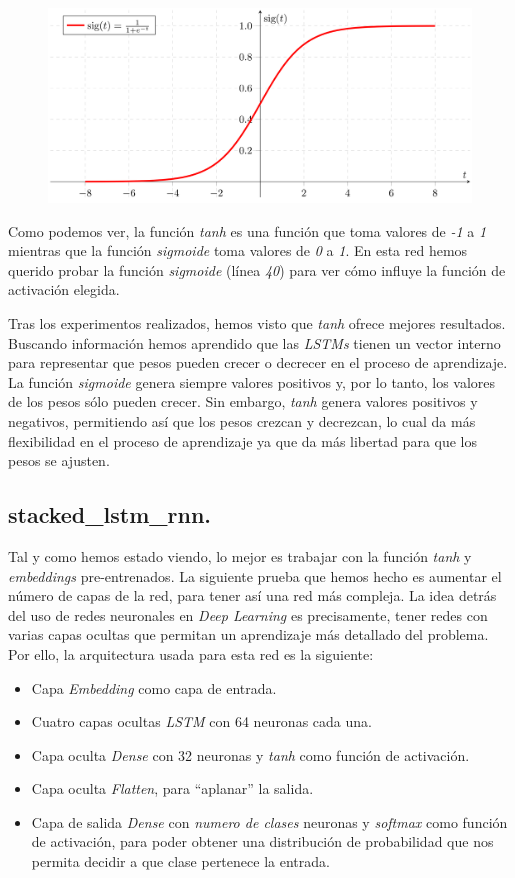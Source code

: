 \documentclass[11pt]{article}
\begin{document}
\begin{figure}[H]
\centering
\includegraphics[width=0.5\linewidth]{images/sigmoid.png}
\end{figure}

Como podemos ver, la función \textit{tanh} es una función que toma valores de \textit{-1} a \textit{1} mientras que la función \textit{sigmoide} toma valores de \textit{0} a \textit{1}. En esta red hemos querido probar la función \textit{sigmoide} (línea \textit{40}) para ver cómo influye la función de activación elegida.



Tras los experimentos realizados, hemos visto que \textit{tanh} ofrece mejores resultados. Buscando información hemos aprendido que las \textit{LSTMs} tienen un vector interno para representar que pesos pueden crecer o decrecer en el proceso de aprendizaje. La función \textit{sigmoide} genera siempre valores positivos y, por lo tanto, los valores de los pesos sólo pueden crecer. Sin embargo, \textit{tanh} genera valores positivos y negativos, permitiendo así que los pesos crezcan y decrezcan, lo cual da más flexibilidad en el proceso de aprendizaje ya que da más libertad para que los pesos se ajusten.

\subsection{stacked\_lstm\_rnn.} \label{stackedlstmrnn}

Tal y como hemos estado viendo, lo mejor es trabajar con la función \textit{tanh} y \textit{embeddings} pre-entrenados. La siguiente prueba que hemos hecho es aumentar el número de capas de la red, para tener así una red más compleja. La idea detrás del uso de redes neuronales en \textit{Deep Learning} es precisamente, tener redes con varias capas ocultas que permitan un aprendizaje más detallado del problema. Por ello, la arquitectura usada para esta red es la siguiente:

\begin{itemize}
    \item Capa \textit{Embedding} como capa de entrada.
    \item Cuatro capas ocultas \textit{LSTM} con 64 neuronas cada una.
    \item Capa oculta \textit{Dense} con 32 neuronas y \textit{tanh} como función de activación.
    \item Capa oculta \textit{Flatten}, para ``aplanar'' la salida.
    \item Capa de salida \textit{Dense} con \textit{numero de clases} neuronas y \textit{softmax} como función de activación, para poder obtener una distribución de probabilidad que nos permita decidir a que clase pertenece la entrada.
\end{itemize}
\end{document}
